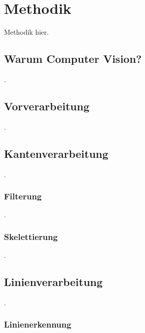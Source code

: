 
\section{Methodik}
\label{sec:cv:methodik}

Methodik hier.

\subsection{Warum Computer Vision?}
\label{sec:warum_cv}

.

\subsection{Vorverarbeitung}
\label{sec:vorverarbeitung}

.

\subsection{Kantenverarbeitung}
\label{sec:kanten}

.

\subsubsection{Filterung}
\label{sec:filterung}

.

\subsubsection{Skelettierung}
\label{sec:skelettierung}

.

\subsection{Linienverarbeitung}
\label{sec:linien}

.

\subsubsection{Linienerkennung}
\label{sec:linienerkennung}

